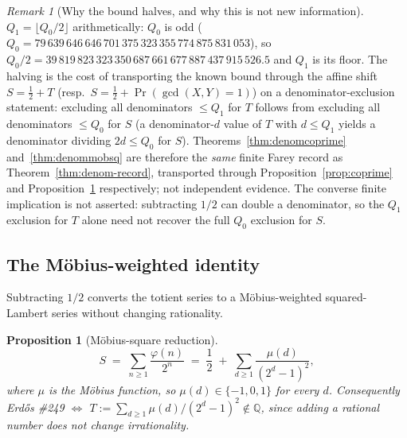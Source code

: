 \documentclass[11pt]{article}
\theoremstyle{plain}
\newtheorem{prop}[thm]{Proposition}
\theoremstyle{definition}
\theoremstyle{remark}
\newtheorem{rem}[thm]{Remark}
\begin{document}
\begin{rem}[Why the bound halves, and why this is not new information]
$Q_1 = \lfloor Q_0/2 \rfloor$ arithmetically: $Q_0$ is odd
($Q_0 = 79\,639\,646\,646\,701\,375\,323\,355\,774\,875\,831\,053$), so
$Q_0/2 = 39\,819\,823\,323\,350\,687\,661\,677\,887\,437\,915\,526.5$ and
$Q_1$ is its floor. The halving is the cost of transporting the known bound
through the affine shift
$S = \tfrac12 + T$ (resp.\ $S = \tfrac12 + \Pr(\gcd(X,Y)=1)$) on a
denominator-exclusion statement: excluding all denominators $\le Q_1$ for $T$
follows from excluding all denominators $\le Q_0$ for $S$ (a denominator-$d$
value of $T$ with $d\le Q_1$ yields a
denominator dividing $2d\le Q_0$ for $S$). Theorems~\ref{thm:denomcoprime}
and~\ref{thm:denommobsq} are therefore the \emph{same} finite Farey record as
Theorem~\ref{thm:denom-record}, transported through Proposition~\ref{prop:coprime}
and Proposition~\ref{prop:mobsq} respectively; not independent evidence.
The converse finite implication is not asserted: subtracting $1/2$ can double
a denominator, so the $Q_1$ exclusion for $T$ alone need not recover the full
$Q_0$ exclusion for $S$.
\end{rem}

\subsection{The M\"obius-weighted identity}
\label{ssec:mobius}

Subtracting $1/2$ converts the totient series to a M\"obius-weighted
squared-Lambert series without changing rationality.

\begin{prop}[M\"obius-square reduction]
\label{prop:mobsq}
\[
S \;=\; \sum_{n\ge1}\frac{\varphi(n)}{2^n} \;=\; \frac12 \;+\; \sum_{d\ge1}\frac{\mu(d)}{(2^d-1)^2},
\]
where $\mu$ is the M\"obius function, so $\mu(d)\in\{-1,0,1\}$ for every $d$.
Consequently \emph{Erd\H{o}s \#249 $\iff$ $T:=\sum_{d\ge1}\mu(d)/(2^d-1)^2 \notin \mathbb{Q}$},
since adding a rational number does not change irrationality.
\end{prop}
\end{document}
